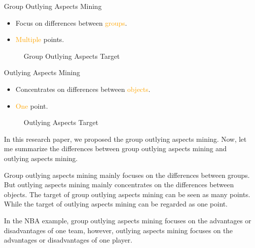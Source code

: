 \documentclass[
 size=14pt,
 paper=smartboard,  %
 mode=present, 		%
 display=slides, 	%
 style=tuliplab,  	%
 pauseslide,
 fleqn,leqno]{powerdot}
\begin{document}
\begin{slide}[toc=,bm=]{}
\twocolumn
{
Group Outlying Aspects Mining
\begin{itemize}
\item
\smallskip
Focus on differences between \textcolor{orange}{groups}.

\item
\smallskip
\textcolor{orange}{Multiple} points.
\medskip
\end{itemize}
\vspace{0.75cm}
\begin{figure}
  \centering
  \caption{Group Outlying Aspects Target}\label{fig:GroupOutAspect-target}
\end{figure}
}
{
Outlying Aspects Mining
\begin{itemize}
\item
Concentrates on differences between \textcolor{orange}{objects}.

\item
\textcolor{orange}{One} point.
\end{itemize}
\bigskip
\begin{figure}
  \centering
  \caption{Outlying Aspects Target}\label{fig:OutAspect-target}
\end{figure}
}

\begin{note}
In this research paper,
we proposed the group outlying aspects mining.
Now,
let me summarize the differences between group outlying aspects mining and outlying aspects mining.

Group outlying aspects mining mainly focuses on the differences between groups.
But outlying aspects mining mainly concentrates on the differences between objects.
The target of group outlying aspects mining can be seen as many points.
While the target of outlying aspects mining can be regarded as one point.

In the NBA example,
group outlying aspects mining focuses on the advantages
or disadvantages of one team,
however,
outlying aspects mining focuses on the advantages or disadvantages of one player.
\end{note}

\end{slide}
\end{document}
